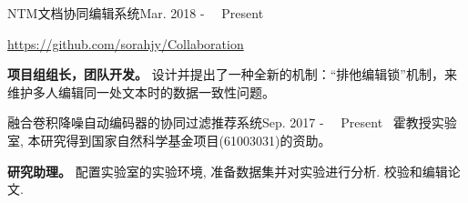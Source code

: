 \documentclass{sorahjy_cv}
\begin{document}
\begin{sectionContentSimple}{NTM文档协同编辑系统}{Mar. 2018 - \ \ Present \ }
	\item \url{https://github.com/sorahjy/Collaboration}
	\item \textbf{项目组组长，团队开发。} 设计并提出了一种全新的机制：“排他编辑锁”机制，来维护多人编辑同一处文本时的数据一致性问题。
\end{sectionContentSimple}


\begin{sectionContentNormal}{融合卷积降噪自动编码器的协同过滤推荐系统}{Sep. 2017 - \ \ Present \ }{霍教授实验室, 本研究得到国家自然科学基金项目(61003031)的资助。 }
	\item \textbf{研究助理。} 配置实验室的实验环境, 准备数据集并对实验进行分析. 校验和编辑论文.
\end{sectionContentNormal}

%
%



%
%






\end{document}
